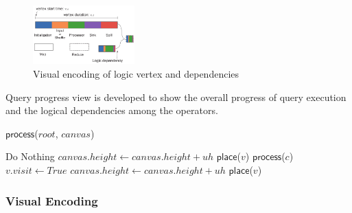\begin{figure}[t]
	\centering
	\includegraphics[width=0.35\textwidth]{figures/visualization/progressdesign.pdf}
	\vspace{-3mm}
	\caption{Visual encoding of logic vertex and dependencies}
	\label{fig:progress}
	\vspace{-3mm}
\end{figure}

Query progress view is developed to show the overall progress of query execution and the logical dependencies among the operators. 

\begin{algorithm}
	\caption{$\mathsf{TDAGLayout}$ ($R$, $canvas$)}
	\label{alg:TDAGLayout}
	\begin{algorithmic}[1]
		\State$\mathsf{process}$($root$, $canvas$)
		\EndFor
	\end{algorithmic}

\end{algorithm}

\begin{algorithm}
	\caption{$\mathsf{process}$($v$, $canvas$)}
	\label{alg:process}
	\begin{algorithmic}[1]
			\State Do Nothing
		\EndIf
				\State $canvas.height \leftarrow canvas.height + uh$
				\State $\mathsf{place}$($v$)
			\EndIf
		\Else
				\State $\mathsf{process}$($c$)
					\State $v.visit \leftarrow True$
				\EndIf
			\EndFor
				\State $canvas.height \leftarrow canvas.height + uh$
				\State $\mathsf{place}$($v$)
			\EndIf
		\EndIf
	\end{algorithmic}
\end{algorithm}


\subsubsection{Visual Encoding}

